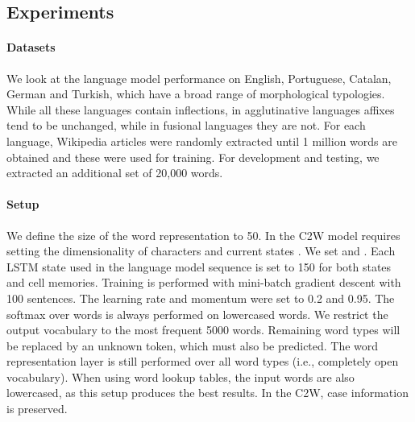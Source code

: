 \documentclass[11pt]{article}
\newcommand{\ignore}[1]{}
\begin{document}
\begin{CJK*}{UTF8}{gbsn}
\subsection{Experiments}
\paragraph{Datasets}
\ignore{Languages can be characterized by the morphological processes they use as being either analytic or synthetic. Analytic languages, such as English, contain relatively little inflection, and rely on word order and auxiliary words to express grammatical relations. Synthetic languages can be further divided into fusional and agglutinative languages. While both allow words to be inflected, . }
We look at the language model performance on English, Portuguese, Catalan, German and Turkish, which have a broad range of morphological typologies. While all these languages contain inflections, in agglutinative languages affixes tend to be unchanged, while in fusional languages they are not. For each language, Wikipedia articles were randomly extracted until 1 million words are obtained and these were used for training. For development and testing, we extracted an additional set of 20,000 words.

\paragraph{Setup}
We define the size of the word representation  to 50. In the C2W model requires setting the dimensionality of characters  and current states . We set  and . Each LSTM state used in the language model sequence  is set to 150 for both states and cell memories. Training is performed with mini-batch gradient descent with 100 sentences. The learning rate and momentum were set to 0.2 and 0.95. The softmax over words is always performed on lowercased words. \ignore{the softmax operation can be computationally expensive to compute over large vocabularies 100K words. While there are more efficient methods to approximate the softmax function~\cite{Mnih12afast}, as our work is focused on learning better representations, we decided to use a simpler approach.} We restrict the output vocabulary to the most frequent 5000 words. Remaining word types will be replaced by an unknown token, which must also be predicted. The word representation layer is still performed over all word types (i.e., completely open vocabulary). When using word lookup tables, the input words are also lowercased, as this setup produces the best results. In the C2W, case information is preserved. 


\end{CJK*}
\end{document}
